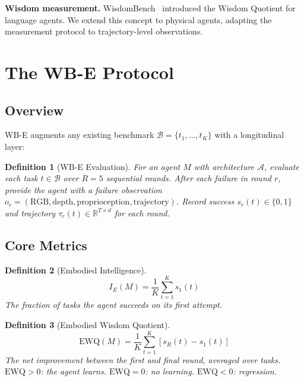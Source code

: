 \documentclass{article}
\newtheorem{definition}{Definition}
\newcommand{\cA}{\mathcal{A}}
\newcommand{\R}{\mathbb{R}}
\newcommand{\EWQ}{\mathrm{EWQ}}
\begin{document}
\textbf{Wisdom measurement.}
WisdomBench~\citep{sovereign2026p2} introduced the Wisdom Quotient for language agents.
We extend this concept to physical agents, adapting the measurement protocol to trajectory-level observations.

\section{The WB-E Protocol}
\label{sec:protocol}

\subsection{Overview}

WB-E augments any existing benchmark $\mathcal{B} = \{t_1, \ldots, t_K\}$ with a longitudinal layer:

\begin{definition}[WB-E Evaluation]
For an agent $M$ with architecture $\cA$, evaluate each task $t \in \mathcal{B}$ over $R = 5$ sequential rounds.
After each failure in round $r$, provide the agent with a \emph{failure observation} $o_r = (\text{RGB}, \text{depth}, \text{proprioception}, \text{trajectory})$.
Record success $s_r(t) \in \{0, 1\}$ and trajectory $\tau_r(t) \in \R^{T \times d}$ for each round.
\end{definition}

\subsection{Core Metrics}

\begin{definition}[Embodied Intelligence]
\begin{equation}
    I_E(M) = \frac{1}{K} \sum_{t=1}^{K} s_1(t)
\end{equation}
The fraction of tasks the agent succeeds on its first attempt.
\end{definition}

\begin{definition}[Embodied Wisdom Quotient]
\begin{equation}
    \EWQ(M) = \frac{1}{K} \sum_{t=1}^{K} \left[s_R(t) - s_1(t)\right]
\end{equation}
The net improvement between the first and final round, averaged over tasks.
$\EWQ > 0$: the agent learns. $\EWQ = 0$: no learning. $\EWQ < 0$: regression.
\end{definition}
\end{document}
